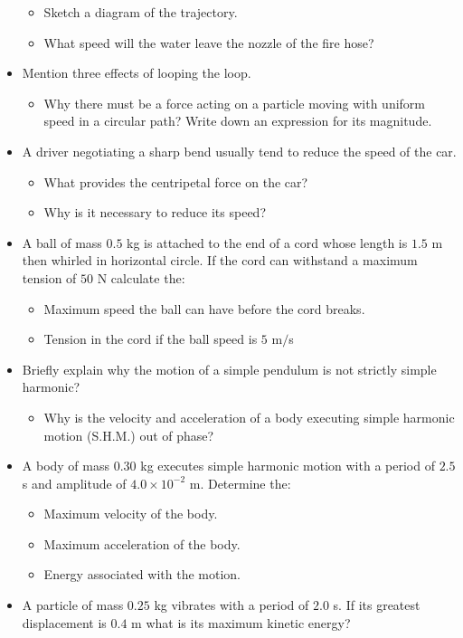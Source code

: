 \documentclass{article}
\begin{document}
\begin{itemize}
 \begin{itemize}
\item  Sketch a diagram of the trajectory.
\item What speed will the water leave the nozzle of the fire hose?
\end{itemize}
\item Mention three effects of looping the loop.
 \begin{itemize}
\item Why there must be a force acting on a particle moving with uniform speed in a circular path? Write down an expression for its magnitude. 
\end{itemize}
\item A driver negotiating a sharp bend usually tend to reduce the speed of the car.
 \begin{itemize}
\item  What provides the centripetal force on the car?
\item Why is it necessary to reduce its speed?
\end{itemize}
\item A ball of mass $ 0.5$ kg is attached to the end of a cord whose length is $ 1.5$ m then whirled in horizontal circle. If the cord can withstand a maximum tension of $ 50$ N calculate the:
 \begin{itemize}
\item Maximum speed the ball can have before the cord breaks. 
\item Tension in the cord if the ball speed is $ 5$ m$/$s
\end{itemize}
\item Briefly explain why the motion of a simple pendulum is not strictly simple harmonic? 
 \begin{itemize}
\item Why is the velocity and acceleration of a body executing simple harmonic motion (S.H.M.) out of phase? 
\end{itemize}
\item A body of mass $ 0.30$ kg executes simple harmonic motion with a period of $ 2.5$ s and amplitude of $ 4.0\times10^{-2}$ m. Determine the:
 \begin{itemize}
\item Maximum velocity of the body. 
\item Maximum acceleration of the body. 
\item Energy associated with the motion.
\end{itemize}
\item A particle of mass $ 0.25$ kg vibrates with a period of $ 2.0$ s. If its greatest displacement is $ 0.4$ m what is its maximum kinetic energy?

\end{itemize}
\end{document}
